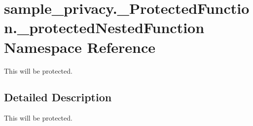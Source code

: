 \hypertarget{namespacesample__privacy_1_1___protected_function_1_1__protected_nested_function}{\section{sample\-\_\-privacy.\-\_\-\-Protected\-Function.\-\_\-protected\-Nested\-Function Namespace Reference}
\label{namespacesample__privacy_1_1___protected_function_1_1__protected_nested_function}
}


This will be protected.  




\subsection{Detailed Description}
This will be protected. 